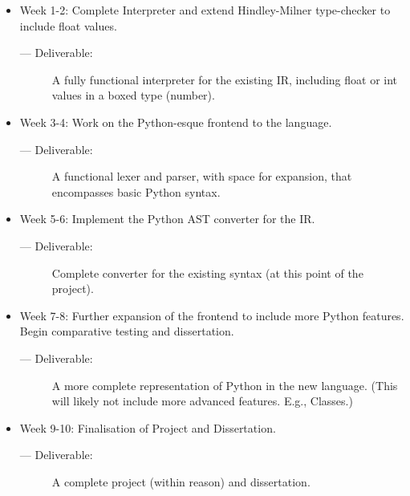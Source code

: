 \documentclass[11pt]{article}
\begin{document}
   \begin{itemize}
    \item Week 1-2: Complete Interpreter and extend Hindley-Milner type-checker to include float values.
    \begin{description}
        \item [— Deliverable:] A fully functional interpreter for the existing IR, including float or int values in a boxed type (number).
    \end{description}

    \item Week 3-4: Work on the Python-esque frontend to the language.
    \begin{description}
        \item[— Deliverable:] A functional lexer and parser, with space for expansion, that encompasses basic Python syntax.
    \end{description}

    \item Week 5-6: Implement the Python AST converter for the IR.
    \begin{description}
        \item[— Deliverable:] Complete converter for the existing syntax (at this point of the project).
    \end{description}

    \item Week 7-8: Further expansion of the frontend to include more Python features. Begin comparative testing and dissertation.
    \begin{description}
        \item[— Deliverable:] A more complete representation of Python in the new language. (This will likely not include more advanced features. E.g., Classes.)
    \end{description}

    \item Week 9-10: Finalisation of Project and Dissertation.
    \begin{description}
        \item[— Deliverable:] A complete project (within reason) and dissertation.
    \end{description}
   \end{itemize} 
    
    
\end{document}
